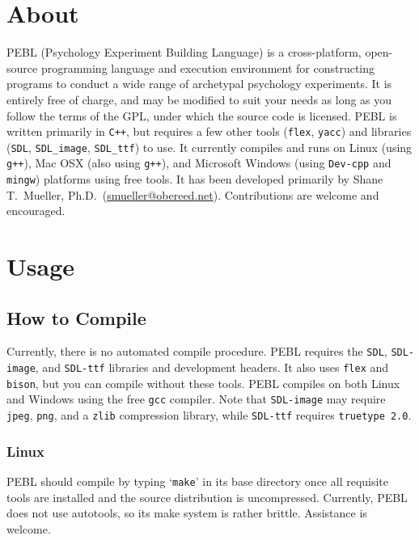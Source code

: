 \chapter{About}

PEBL (Psychology Experiment Building Language) is a cross-platform,
open-source programming language and execution environment for
constructing programs to conduct a wide range of archetypal psychology
experiments. It is entirely free of charge, and may be modified to
suit your needs as long as you follow the terms of the GPL, under
which the source code is licensed. PEBL is written primarily in
\texttt{C++}, but requires a few other tools (\texttt{flex},
\texttt{yacc}) and libraries (\texttt{SDL}, \texttt{SDL\_image},
\texttt{SDL\_ttf}) to use. It currently compiles and runs on Linux
(using \texttt{g++}), Mac OSX (also using \texttt{g++}), and Microsoft
Windows (using \texttt{Dev-cpp} and \texttt{mingw}) platforms using
free tools. It has been developed primarily by Shane T.~Mueller,
Ph.D.~(\href{mailto:smueller@obereed.net}{smueller@obereed.net}).
Contributions are welcome and encouraged.

\chapter{Usage}

\section{How to Compile}

Currently, there is no automated compile procedure.  PEBL requires the
\texttt{SDL}, \texttt{SDL-image}, and \texttt{SDL-ttf} libraries and
development headers.  It also uses \texttt{flex} and \texttt{bison},
but you can compile without these tools. PEBL compiles on both Linux
and Windows using the free \texttt{gcc} compiler. Note that
\texttt{SDL-image} may require \texttt{jpeg}, \texttt{png}, and a
\texttt{zlib} compression library, while \texttt{SDL-ttf} requires
\texttt{truetype 2.0}.

\subsection{Linux}

PEBL should compile by typing `\texttt{make}' in its base directory
once all requisite tools are installed and the source distribution is
uncompressed. Currently, PEBL does not use autotools, so its make
system is rather brittle. Assistance is welcome.

